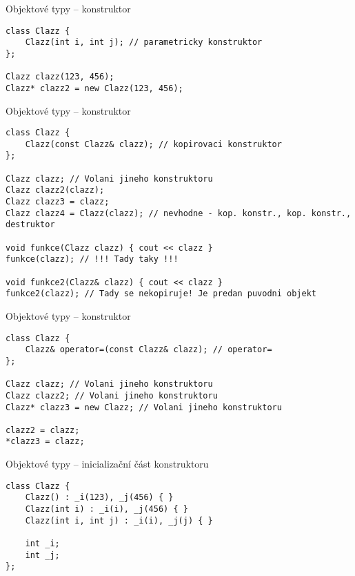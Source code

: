 \begin{frame}[fragile]
\begin{exampleblock}{Objektové typy -- konstruktor} 
\begin{lstlisting}
class Clazz {
	Clazz(int i, int j); // parametricky konstruktor
};

Clazz clazz(123, 456);
Clazz* clazz2 = new Clazz(123, 456);
\end{lstlisting}
\end{exampleblock}
\end{frame}


\begin{frame}[fragile]
\begin{exampleblock}{Objektové typy -- konstruktor} 
\begin{lstlisting}
class Clazz {
	Clazz(const Clazz& clazz); // kopirovaci konstruktor
};

Clazz clazz; // Volani jineho konstruktoru
Clazz clazz2(clazz);
Clazz clazz3 = clazz;
Clazz clazz4 = Clazz(clazz); // nevhodne - kop. konstr., kop. konstr., destruktor

void funkce(Clazz clazz) { cout << clazz }
funkce(clazz); // !!! Tady taky !!!

void funkce2(Clazz& clazz) { cout << clazz }
funkce2(clazz); // Tady se nekopiruje! Je predan puvodni objekt
\end{lstlisting}
\end{exampleblock}
\end{frame}


\begin{frame}[fragile]
\begin{exampleblock}{Objektové typy -- konstruktor} 
\begin{lstlisting}
class Clazz {
	Clazz& operator=(const Clazz& clazz); // operator=
};

Clazz clazz; // Volani jineho konstruktoru
Clazz clazz2; // Volani jineho konstruktoru
Clazz* clazz3 = new Clazz; // Volani jineho konstruktoru

clazz2 = clazz;
*clazz3 = clazz;
\end{lstlisting}
\end{exampleblock}
\end{frame}



\begin{frame}[fragile]
\begin{exampleblock}{Objektové typy -- inicializační část konstruktoru} 
\begin{lstlisting}
class Clazz {
	Clazz() : _i(123), _j(456) { }
	Clazz(int i) : _i(i), _j(456) { }
	Clazz(int i, int j) : _i(i), _j(j) { }

	int _i;
	int _j;
};

\end{lstlisting}
\end{exampleblock}
\end{frame}

